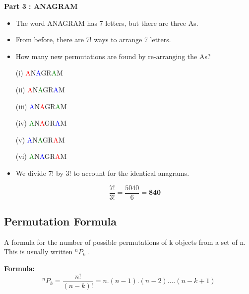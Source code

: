 \documentclass[]{report}
\begin{document}

\textbf{Part 3 : ANAGRAM}\\
\begin{itemize}
	\item The word ANAGRAM has 7 letters, but there are three As.
	\item From before, there are 7! ways to arrange 7 letters.
	\item How many new permutations are found by re-arranging the As?
\end{itemize}

\begin{multicols}{2}
	\begin{itemize}
		\item[(i)]	\textcolor{red}{A}N\textcolor{blue}{A}GR\textcolor{green}{A}M 
		\item[(ii)]		\textcolor{red}{A}N\textcolor{green}{A}GR\textcolor{blue}{A}M 
		\item[(iii)] 		\textcolor{blue}{A}N\textcolor{red}{A}GR\textcolor{green}{A}M  
		\item[(iv)]		\textcolor{green}{A}N\textcolor{red}{A}GR\textcolor{blue}{A}M 
		\item[(v)]	\textcolor{blue}{A}N\textcolor{green}{A}GR\textcolor{red}{A}M 
		\item[(vi)]		\textcolor{green}{A}N\textcolor{blue}{A}GR\textcolor{red}{A}M 
	\end{itemize}
\end{multicols}

\begin{itemize}
	\item We divide 7! by 3! to account for the identical anagrams.
	
	\[\frac{7!}{3!} =  \frac{5040}{6} = \boldsymbol{840} \]
\end{itemize}




\subsection{Permutation Formula}

A formula for the number of possible permutations of k objects from a set of n. This is usually written $^nP_k$ .


\noindent\textbf{Formula:}	
\[ ^nP_k = \frac{n!}{(n-k)!} =  n.(n-1).(n-2).\ldots(n-k+1) \]
\end{document}
